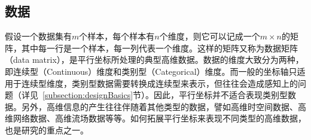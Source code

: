 \documentclass[12pt,twocolumn]{article}
\begin{document}
\subsection{数据}
\label{subsection:dataBasics}
假设一个数据集有$m$个样本，每个样本有$n$个维度，则它可以记成一个$m \times n$的矩阵，其中每一行是一个样本，每一列代表一个维度。这样的矩阵又称为数据矩阵（data matrix），是平行坐标所处理的典型高维数据。数据的维度大致分为两种，即连续型（Continuous）维度和类别型（Categorical）维度。而一般的坐标轴只适用于连续型维度，类别型数据需要转换成连续型来表示，但往往会造成感知上的问题（详见~\ref{subsection:designBasics}节）。因此，平行坐标并不适合表现类别型数据。另外，高维信息的产生往往伴随着其他类型的数据，譬如高维时空间数据、高维网络数据、高维流场数据等等。如何拓展平行坐标来表现不同类型的高维数据，也是研究的重点之一。                                                                                                                                                                                                                                                                                                                                                                                                                                                                                                                                                                                                                                                                                                                                                                                                                                                                                                                                                                                                                                                                                                                                                                                                                                                                                                                                                                                                                                                                                                                                                                                                                                                                                                                                                                                                                                                                                                                                                                                                                                                                                                                                                                                                                                                                                                                                                                                                                                                                                                                                                                                                 
\end{document}
